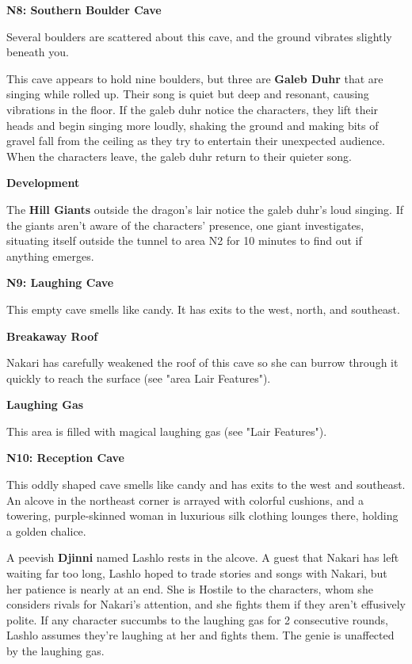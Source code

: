 \documentclass[letterpaper, 11pt, twocolumn]{dndbook}
\begin{document}
\textbf{N8: Southern Boulder Cave}

\begin{DndReadAloud}
Several boulders are scattered about this cave, and the ground vibrates slightly beneath you.
\end{DndReadAloud}

This cave appears to hold nine boulders, but three are \textbf{Galeb Duhr} that are singing while rolled up. Their song is quiet but deep and resonant, causing vibrations in the floor. If the galeb duhr notice the characters, they lift their heads and begin singing more loudly, shaking the ground and making bits of gravel fall from the ceiling as they try to entertain their unexpected audience. When the characters leave, the galeb duhr return to their quieter song.

\textbf{Development}

The \textbf{Hill Giants} outside the dragon's lair notice the galeb duhr's loud singing. If the giants aren't aware of the characters' presence, one giant investigates, situating itself outside the tunnel to area N2 for 10 minutes to find out if anything emerges.

\textbf{N9: Laughing Cave}

\begin{DndReadAloud}
This empty cave smells like candy. It has exits to the west, north, and southeast.
\end{DndReadAloud}

\textbf{Breakaway Roof}

Nakari has carefully weakened the roof of this cave so she can burrow through it quickly to reach the surface (see "area Lair Features").

\textbf{Laughing Gas}

This area is filled with magical laughing gas (see "Lair Features").

\textbf{N10: Reception Cave}

\begin{DndReadAloud}
This oddly shaped cave smells like candy and has exits to the west and southeast. An alcove in the northeast corner is arrayed with colorful cushions, and a towering, purple-skinned woman in luxurious silk clothing lounges there, holding a golden chalice.
\end{DndReadAloud}

A peevish \textbf{Djinni} named Lashlo rests in the alcove. A guest that Nakari has left waiting far too long, Lashlo hoped to trade stories and songs with Nakari, but her patience is nearly at an end. She is Hostile to the characters, whom she considers rivals for Nakari's attention, and she fights them if they aren't effusively polite. If any character succumbs to the laughing gas for 2 consecutive rounds, Lashlo assumes they're laughing at her and fights them. The genie is unaffected by the laughing gas.
\end{document}
